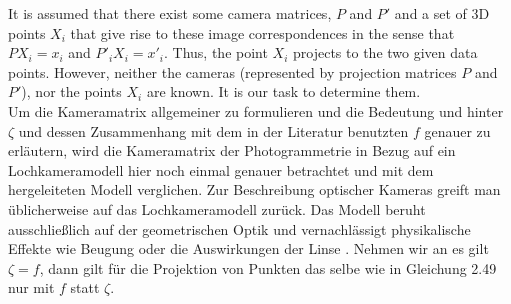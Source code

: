It is assumed that there exist some camera matrices, $P$ and $P'$ and a set of 3D points $X_i$ that give rise to these image correspondences in the sense that $PX_i = x_i$ and $P'_iX_i = x'_i$. Thus, the point $X_i$ projects to the two given data points. However, neither the cameras (represented by projection matrices $P$ and $P'$), nor the points $X_i$ are known. It is our task to determine them.\\




	Um die Kameramatrix allgemeiner zu formulieren und die Bedeutung und hinter $\zeta$ und dessen Zusammenhang mit dem in der Literatur benutzten $f$ genauer zu erläutern, wird die Kameramatrix der Photogrammetrie in Bezug auf ein Lochkameramodell hier noch einmal genauer betrachtet und mit dem hergeleiteten Modell verglichen\cite{HZ,Heipke}. Zur Beschreibung optischer Kameras greift man üblicherweise auf das Lochkameramodell zurück. Das Modell beruht ausschließlich auf der geometrischen Optik und vernachlässigt physikalische Effekte wie Beugung oder die Auswirkungen der Linse \cite{Heipke}.  Nehmen wir an es gilt $\zeta = f$, dann gilt für die Projektion von Punkten das selbe wie in Gleichung 2.49 nur mit $f$ statt $\zeta$. 

